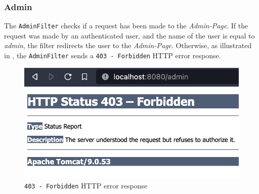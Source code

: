 \subsubsection{Admin}\label{subsubsec:03_impl_filters_admin}
The \texttt{AdminFilter} checks if a request has been made to the \textit{Admin-Page}. If the request was made by an authenticated user, and the name of the user is equal to \textit{admin}, the filter redirects the user to the \textit{Admin-Page}.
Otherwise, as illustrated in , the \texttt{AdminFilter} sends a \texttt{403 - Forbidden} HTTP error response.
\begin{figure}[h]
\centering
\includegraphics[scale=0.4]{images/03_impl/admin-filter/forbidden}
\caption{\texttt{403 - Forbidden} HTTP error response}
\label{fig:03_impl_filters_admin_forbidden}
\end{figure}
